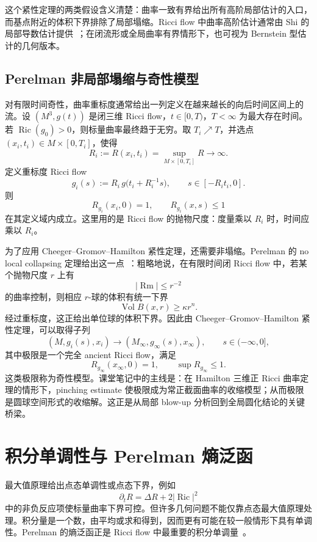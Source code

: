 \documentclass[11pt,a4paper,cn,nofont,math=cm,mode=fancy,bibtex]{elegantbook}
\numberwithin{equation}{chapter}
\numberwithin{figure}{chapter}
\newcommand{\Ric}{\operatorname{Ric}}
\newcommand{\Rm}{\operatorname{Rm}}
\newcommand{\Vol}{\operatorname{Vol}}
\newcommand{\norm}[1]{\left\lvert #1\right\rvert}
\begin{document}
这个紧性定理的两类假设含义清楚：曲率一致有界给出所有高阶局部估计的入口，而基点附近的体积下界排除了局部塌缩。Ricci flow 中曲率高阶估计通常由 Shi 的局部导数估计提供~\cite{Shi1989}；在闭流形或全局曲率有界情形下，也可视为 Bernstein 型估计的几何版本。

\section{Perelman 非局部塌缩与奇性模型}

对有限时间奇性，曲率重标度通常给出一列定义在越来越长的向后时间区间上的流。设 $(M^3,g(t))$ 是闭三维 Ricci flow，$t\in[0,T)$，$T<\infty$ 为最大存在时间。若 $\Ric(g_0)>0$，则标量曲率最终趋于无穷。取 $T_i\nearrow T$，并选点 $(x_i,t_i)\in M\times[0,T_i]$，使得
\begin{equation}\label{eq:choose-max-curv}
  R_i:=R(x_i,t_i)=\sup_{M\times[0,T_i]}R\longrightarrow\infty .
\end{equation}
定义重标度 Ricci flow
\begin{equation}\label{eq:parabolic-rescaling}
  g_i(s):=R_i\,g\bigl(t_i+R_i^{-1}s\bigr),
  \qquad s\in[-R_it_i,0].
\end{equation}
则
\[
  R_{g_i}(x_i,0)=1,
  \qquad R_{g_i}(x,s)\le1
\]
在其定义域内成立。这里用的是 Ricci flow 的抛物尺度：度量乘以 $R_i$ 时，时间应乘以 $R_i$。

为了应用 Cheeger--Gromov--Hamilton 紧性定理，还需要非塌缩。Perelman 的 no local collapsing 定理给出这一点~\cite{Perelman2002}：粗略地说，在有限时间闭 Ricci flow 中，若某个抛物尺度 $r$ 上有
\[
  \norm{\Rm}\le r^{-2}
\]
的曲率控制，则相应 $r$-球的体积有统一下界
\[
  \Vol B(x,r)\ge \kappa r^n .
\]
经过重标度，这正给出单位球的体积下界。因此由 Cheeger--Gromov--Hamilton 紧性定理，可以取得子列
\[
  (M,g_i(s),x_i)\longrightarrow (M_\infty,g_\infty(s),x_\infty),
  \qquad s\in(-\infty,0],
\]
其中极限是一个完全 ancient Ricci flow，满足
\[
  R_{g_\infty}(x_\infty,0)=1,
  \qquad \sup R_{g_\infty}\le1.
\]
这类极限称为奇性模型。课堂笔记中的主线是：在 Hamilton 三维正 Ricci 曲率定理的情形下，pinching estimate 使极限成为常正截面曲率的收缩模型；从而极限是圆球空间形式的收缩解。这正是从局部 blow-up 分析回到全局圆化结论的关键桥梁。

\chapter{积分单调性与 Perelman 熵泛函}

最大值原理给出点态单调性或点态下界，例如
\[
  \partial_tR=\Delta R+2\norm{\Ric}^2
\]
中的非负反应项使标量曲率下界可控。但许多几何问题不能仅靠点态最大值原理处理。积分量是一个数，由平均或求和得到，因而更有可能在较一般情形下具有单调性。Perelman 的熵泛函正是 Ricci flow 中最重要的积分单调量~\cite{Perelman2002}。
\end{document}
